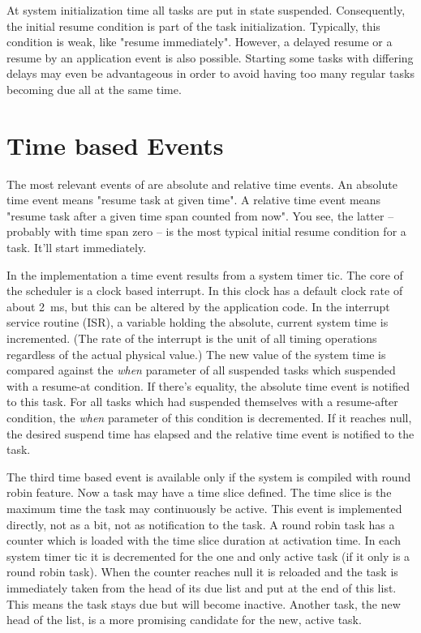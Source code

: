 At system initialization time all tasks are put in state suspended.
Consequently, the initial resume condition is part of the task
initialization. Typically, this condition is weak, like "resume
immediately". However, a delayed resume or a resume by an application
event is also possible. Starting some tasks with differing delays may even
be advantageous in order to avoid having too many regular tasks becoming
due all at the same time.


\section{Time based Events}
\label{secTimeBasedEvents}

The most relevant events of \rtos{} are absolute and relative time events.
An absolute time event means "resume task at given time". A relative time
event means "resume task after a given time span counted from now". You
see, the latter -- probably with time span zero -- is the most typical
initial resume condition for a task. It'll start immediately.

In the implementation a time event results from a system timer tic. The
core of the scheduler is a clock based interrupt. In \rtos{} this clock
has a default clock rate of about 2~ms, but this can be altered by the
application code. In the interrupt service routine (ISR), a variable
holding the absolute, current system time is incremented. (The rate of the
interrupt is the unit of all timing operations regardless of the actual
physical value.) The new value of the system time is compared against the
\emph{when} parameter of all suspended tasks which suspended with a
resume-at condition. If there's equality, the absolute time event is
notified to this task. For all tasks which had suspended themselves with a
resume-after condition, the \emph{when} parameter of this condition is
decremented. If it reaches null, the desired suspend time has elapsed and
the relative time event is notified to the task.

The third time based event is available only if the system is compiled
with round robin feature. Now a task may have a time slice defined. The
time slice is the maximum time the task may continuously be active. This
event is implemented directly, not as a bit, not as notification to the
task. A round robin task has a counter which is loaded with the time slice
duration at activation time. In each system timer tic it is decremented
for the one and only active task (if it only is a round robin task). When
the counter reaches null it is reloaded and the task is immediately taken
from the head of its due list and put at the end of this list. This means
the task stays due but will become inactive. Another task, the new head of
the list, is a more promising candidate for the new, active task.

